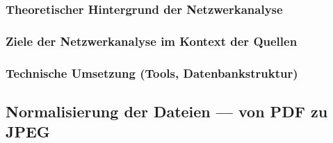 \documentclass[12pt, a4paper, ngerman, bidi=default]{article}
\begin{document}
        \subsubsection{Theoretischer Hintergrund der Netzwerkanalyse}
        \subsubsection{Ziele der Netzwerkanalyse im Kontext der Quellen}
        \subsubsection{Technische Umsetzung (Tools, Datenbankstruktur)}

\subsection{Normalisierung der Dateien --- von PDF zu JPEG}
\end{document}
